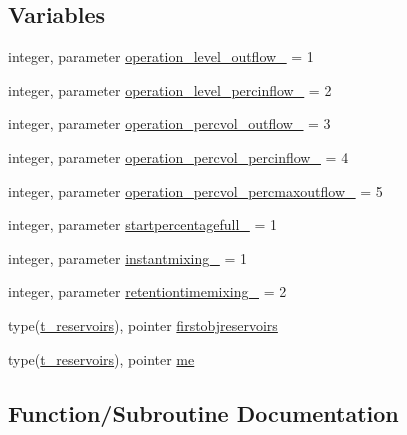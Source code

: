 \subsection*{Variables}
\begin{DoxyCompactItemize}
\item 
integer, parameter \mbox{\hyperlink{namespacemodulereservoirs_a19b393dc0624488197fbecad37587566}{operation\+\_\+level\+\_\+outflow\+\_\+}} = 1
\item 
integer, parameter \mbox{\hyperlink{namespacemodulereservoirs_af9fabeb6c84ab0b9a68fff20028bd317}{operation\+\_\+level\+\_\+percinflow\+\_\+}} = 2
\item 
integer, parameter \mbox{\hyperlink{namespacemodulereservoirs_a34788723d1f6ba791d0344811d1907bc}{operation\+\_\+percvol\+\_\+outflow\+\_\+}} = 3
\item 
integer, parameter \mbox{\hyperlink{namespacemodulereservoirs_ab76bcba6606b22f86a6e7a9ca61fa934}{operation\+\_\+percvol\+\_\+percinflow\+\_\+}} = 4
\item 
integer, parameter \mbox{\hyperlink{namespacemodulereservoirs_a5b1a48d491a0ed184c0a3ae8af4140af}{operation\+\_\+percvol\+\_\+percmaxoutflow\+\_\+}} = 5
\item 
integer, parameter \mbox{\hyperlink{namespacemodulereservoirs_af656754da8b9984c6c96e6c670f23d02}{startpercentagefull\+\_\+}} = 1
\item 
integer, parameter \mbox{\hyperlink{namespacemodulereservoirs_a0ab14e4de96cf34622fde6a0957a5313}{instantmixing\+\_\+}} = 1
\item 
integer, parameter \mbox{\hyperlink{namespacemodulereservoirs_a75087a570e215ca36c369207496fd7a7}{retentiontimemixing\+\_\+}} = 2
\item 
type(\mbox{\hyperlink{structmodulereservoirs_1_1t__reservoirs}{t\+\_\+reservoirs}}), pointer \mbox{\hyperlink{namespacemodulereservoirs_a2579611f53e15ae9991a82aefe41a57f}{firstobjreservoirs}}
\item 
type(\mbox{\hyperlink{structmodulereservoirs_1_1t__reservoirs}{t\+\_\+reservoirs}}), pointer \mbox{\hyperlink{namespacemodulereservoirs_a1c6b704e6fc6d68170696d5d668502ba}{me}}
\end{DoxyCompactItemize}


\subsection{Function/\+Subroutine Documentation}
\mbox{\label{namespacemodulereservoirs_a2452a1e02e4d13c0c920c8d181bf2e79}} 
